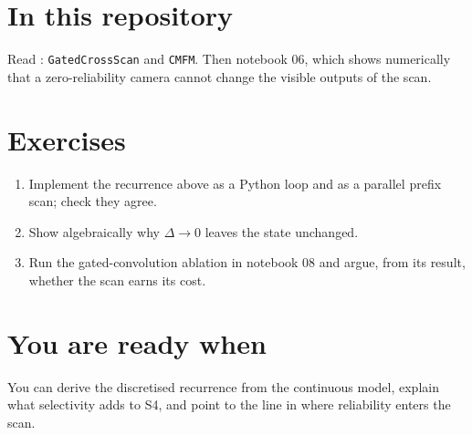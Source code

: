 \section{In this repository}

Read : \texttt{GatedCrossScan} and \texttt{CMFM}. Then notebook 06,
which shows numerically that a zero-reliability camera cannot change the visible outputs of the scan.

\section{Exercises}

\begin{enumerate}
  \item Implement the recurrence above as a Python loop and as a parallel prefix scan; check they agree.
  \item Show algebraically why $\Delta \to 0$ leaves the state unchanged.
  \item Run the gated-convolution ablation in notebook 08 and argue, from its result, whether the scan earns its cost.
\end{enumerate}

\section{You are ready when}

You can derive the discretised recurrence from the continuous model, explain what selectivity adds to S4, and
point to the line in  where reliability enters the scan.
